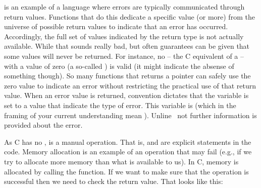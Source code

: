  is an example of a language where errors are typically communicated through return values. Functions that do this dedicate a specific value (or more) from the universe of possible return values to indicate that an error has occurred. Accordingly, the full set of values indicated by the return type is not actually available. While that sounds really bad, but often guarantees can be given that some values will never be returned. For instance, no  -- the C equivalent of a  -- with a value of zero (a so-called ) is valid (it might indicate the absense of something though). So many functions that returns a pointer can safely use the zero value to indicate an error without restricting the practical use of that return value. When an error value is returned, convention dictates that the  variable is set to a value that indicate the type of error. This variable is  (which in the framing of your current understanding mean ). Unline \csharp\ not further information is provided about the error.

As C has no ,  is a manual operation. That is,  and  are explicit statements in the code. Memory allocation is an example of an operation that may fail (e.g., if we try to allocate more memory than what is available to us). In C, memory is allocated by calling the  function. If we want to make sure that the operation is successful then we need to check the return value. That looks like this:


